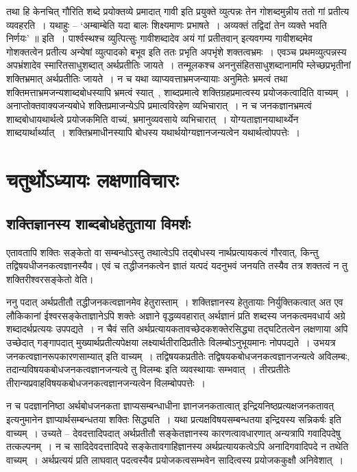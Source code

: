			तथा हि केनचित् गौरिति शब्दे प्रयोक्तव्ये प्रमादात् गावी इति प्रयुक्ते व्युत्पन्नः तेन गोशब्दमुन्नीय ततो गां प्रतीत्य व्यवहरति~। यथाहुः – ‘अम्बाम्बेति यदा बालः शिक्ष्यमाणः प्रभाषते~। अव्यक्तं तद्विदां तेन व्यक्ते भवति निर्णयः’ ॥ इति~। पार्श्वस्थश्च व्युत्पित्सुः गावीशब्दादेव अयं गां प्रतीतवान् इत्यवगम्य गावीशब्दमेव गोशक्तत्वेन प्रतीत्य अन्येषां व्युत्पादको बभूव इति ततः प्रभृति अपभृंशे शक्तत्वभ्रमः~। एवञ्च प्रथमव्युत्पन्नस्य अपभ्रंशादेव स्मारितसाधुशब्दात् अर्थप्रतीतिः जायते~। तन्मूलकश्च अननुसंहितसाधुशब्दानामपि म्लेच्छप्रभृतीनां शक्तिभ्रमात् अर्थप्रतीतिः जायते~। न च यथा व्याप्यवत्ताभ्रमजन्यायाः अनुमितेः भ्रमत्वं तथा शक्तिमत्ताभ्रमजन्यशाब्दबोधस्यापि भ्रमत्वं स्यात्~, शाब्दप्रमात्वे शक्तिग्रहप्रमात्वस्य प्रयोजकत्वादिति वाच्यम्~। अनाप्तोक्तवाक्यजन्यबोधे शक्तिप्रमाजन्येऽपि प्रमात्वविरहेण व्यभिचारात्~। न च जनकज्ञानभ्रमत्वं शाब्दबोधायथार्थत्वे प्रयोजकमिति वाच्यं, भ्रमानुव्यवसाये व्यभिचारात्~। योग्यताज्ञानयाथार्थ्येन शाब्दयार्थार्थ्यात्~। शक्तिभ्रमाधीनस्यापि  बोधस्य यथार्थयोग्यज्ञानजन्यत्वेन यथार्थत्वोपपत्तेः~। 

\chapter{चतुर्थोऽध्यायः लक्षणाविचारः}

	\section{शक्तिज्ञानस्य शाब्दबोधहेतुताया विमर्शः}

		एतावतापि शक्तिः सङ्केतो वा सम्बन्धोऽस्तु तथात्वेऽपि तद्बोधस्य नार्थप्रत्यायकत्वं गौरवात्, किन्तु तद्विषयधीजनकत्वज्ञानस्यैव। एवं च तद्धीजनकत्वेन ज्ञातं यत्पदं यदनुभवं जनयति तस्यैव तत्र शक्तत्वं न तु शक्तिरीश्वरसङ्केतो वेति।
		
		ननु पदात् अर्थप्रतीतौ तद्धीजनकत्वज्ञानमेव हेतुरास्ताम्~। शक्तिज्ञानस्य हेतुतायाः निर्युक्तिकत्वात् अत एव लौकिकानां ईश्वरसङ्केताज्ञानेऽपि शक्तेः अज्ञाने वृद्धव्यवहारात् अर्थज्ञानं प्रति शब्दस्य जनकत्वमवधार्य अग्रे शब्दादर्थप्रत्ययः उपपद्यते~। न चैवं सति अर्थप्रत्यायकतावच्छेदकशक्तेरसिद्ध्या तद्घटितत्वेन लक्षणाया अपि उच्छेदात् गङ्गापदात् मुख्यार्थप्रतीत्यपेक्षया लक्ष्यार्थतीरादिप्रतीतेः विलम्बोऽनुभूयमानः नोपपद्यते~। उभयत्र जनकत्वज्ञानरूपकारणसाम्यात् इति वाच्यम्~। तद्विषयकप्रतीतेः तद्विषयकबोधजनकत्वज्ञानजन्यत्वे अविलम्बः, तदान्यविषयकबोधजनकत्वज्ञानजन्यत्वे तु विलम्बः इति व्यवस्थायाः सम्भवात्~। तीरप्रतीतेः तीरान्यप्रवाहविषयकबोधजनकत्वज्ञानजन्यत्वेन विलम्बोपपत्तेः~। 

		न च पदज्ञाननिष्ठा अर्थबोधजनकता ज्ञाप्यसम्बन्धाधीना ज्ञानजनकतात्वात् इन्द्रियनिष्ठप्रत्यक्षजनकतावत् इत्यनुमानेन ज्ञाप्यार्थसम्बन्धतया शक्तिः सिद्ध्यति~। यथा प्रत्यक्षविषयसम्बन्धतया इन्द्रियस्य सन्निकर्षः इति वाच्यम्~। उच्यते – देवदत्तादिपदात् अर्थप्रतीतौ सङ्केतज्ञानस्य कारणत्वावधारणात् अन्यत्रापि गवादिपदेषु तत्कल्पनम्~। न च सादिदेवदत्तादिपदे सङ्केतावगाहिज्ञानस्य अर्थप्रत्यायकत्वेऽपि अनादिगवादिपदे न तथेति वाच्यम्~। अर्थप्रत्ययं प्रति लाघवात् पदत्वस्यैव प्रयोजकत्वसम्भवेन सादित्वस्य प्रयोजककुक्षौ अनिवेशात्~। 
 
